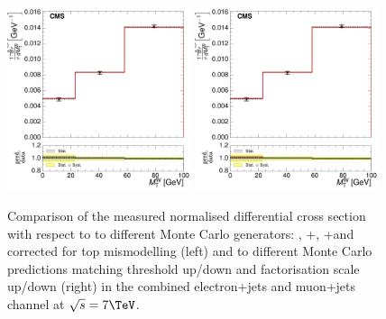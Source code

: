 \begin{figure}[hbtp]
    \centering
     \includegraphics[width=0.48\textwidth]{Chapters/04_Analysis/04b_XSections/images/results/7TeV/MT/central/normalised_xsection_combined_different_generators.pdf}\hfill
     \includegraphics[width=0.48\textwidth]{Chapters/04_Analysis/04b_XSections/images/results/7TeV/MT/central/normalised_xsection_combined_systematics_shifts.pdf}\hfill
     \caption{Comparison of the measured normalised differential cross section with respect to \mt to
     different Monte Carlo generators: \MADGRAPH, \POWHEG+\HERWIG, \POWHEG+\PYTHIA and \MADGRAPH corrected for
     top \pt mismodelling (left) and to different Monte Carlo predictions matching threshold up/down and
     factorisation scale up/down (right) in the combined electron+jets and muon+jets channel at
     $\sqrt{s}=7\TeV$.}
     \label{fig:result_WPT_7TeV_combined}
\end{figure}

